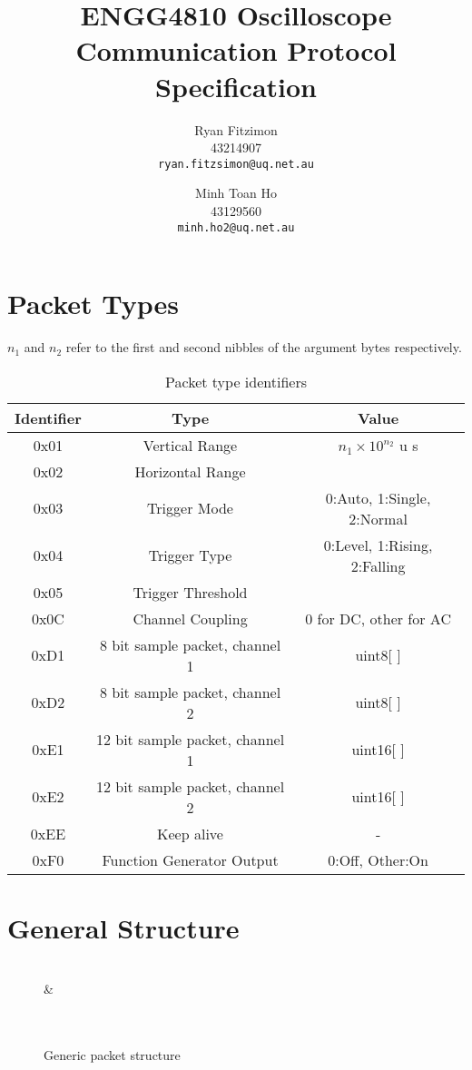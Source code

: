 \documentclass[]{article}
\title{ENGG4810 Oscilloscope Communication Protocol Specification}
\author{
	Ryan Fitzimon\\
	43214907\\
	\texttt{ryan.fitzsimon@uq.net.au}
	\and
	Minh Toan Ho\\
	43129560\\
	\texttt{minh.ho2@uq.net.au}
}
\begin{document}
\maketitle

\section{Packet Types}

$n_1$ and $n_2$ refer to the first and second nibbles of the argument bytes respectively.

\begin{table}[H]
	\renewcommand{\arraystretch}{1.2}
	\centering
	\begin{tabular}{|c|c|c|}
		\hline
		\textbf{Identifier} & \textbf{Type} & \textbf{Value} \\ \hline
		0x01 & Vertical Range & $n_1 \times 10^{n_2}$ u s \\ \hline
		0x02 & Horizontal Range & \\ \hline
		0x03 & Trigger Mode & 0:Auto, 1:Single, 2:Normal \\ \hline
		0x04 & Trigger Type & 0:Level, 1:Rising, 2:Falling \\ \hline
		0x05 & Trigger Threshold &  \\ \hline
		0x0C & Channel Coupling & 0 for DC, other for AC \\ \hline
		0xD1 & 8 bit sample packet, channel 1 & uint8[ ] \\ \hline
		0xD2 & 8 bit sample packet, channel 2 & uint8[ ] \\ \hline
		0xE1 & 12 bit sample packet, channel 1 & uint16[ ] \\ \hline
		0xE2 & 12 bit sample packet, channel 2 & uint16[ ] \\ \hline
		0xEE & Keep alive & - \\ \hline
		0xF0 & Function Generator Output & 0:Off, Other:On \\ \hline
	\end{tabular}
	\caption{Packet type identifiers}
\end{table}

\section{General Structure}
\begin{figure}[H]
	\centering
	\begin{bytefield}[bitwidth=2em]{16}
		 \\
		 &  \\
		 \\
		 \\
	\end{bytefield}
	\caption{Generic packet structure}
\end{figure}
\end{document}
